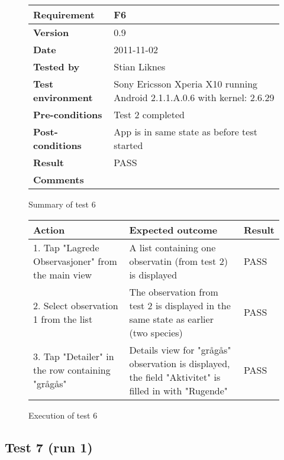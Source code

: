 	\begin{figure}[htb]
		\centering
		\begin{tabular}{|p{3.5cm}|p{7.0cm}|} \hline
			\textbf{Requirement} & F6 \\ \hline
			\textbf{Version} & 0.9 \\ \hline
			\textbf{Date} & 2011-11-02 \\ \hline
			\textbf{Tested by} & Stian Liknes \\ \hline
			\textbf{Test environment} & Sony Ericsson Xperia X10 running Android 2.1.1.A.0.6 with kernel: 2.6.29 \\ \hline
			\textbf{Pre-conditions} & Test 2 completed \\ \hline
			\textbf{Post-conditions} & App is in same state as before test started \\ \hline
			\textbf{Result} & PASS \\ \hline
			\textbf{Comments} & \\ \hline
		\end{tabular}
		\caption{Summary of test 6}
	\end{figure}

	\begin{figure}[htb]
		\centering
		\begin{tabular}{|p{5.0cm}|p{5.0cm}|p{1cm}|}
			\hline \textbf{Action} & \textbf{Expected outcome} & \textbf{Result} \\ \hline
				1. Tap "Lagrede Observasjoner" from the main view &
				A list containing one observatin (from test 2) is displayed &
				PASS \\ \hline

				2. Select observation 1 from the list &
				The observation from test 2 is displayed in the same state as
				earlier (two species) &
				PASS \\ \hline

				3. Tap "Detailer" in the row containing "grågås" &
				Details view for "grågås" observation is displayed, the field "Aktivitet"
				is filled in with "Rugende" &
				PASS \\ \hline
		\end{tabular}
		\caption{Execution of test 6}
	\end{figure}

\newpage
\subsection*{Test 7 (run 1)}

